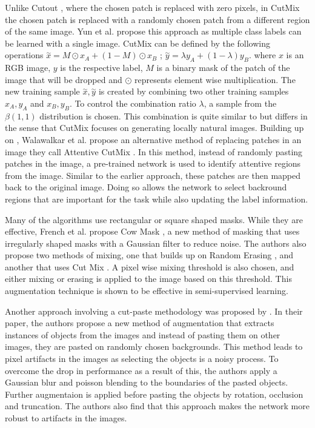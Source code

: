 Unlike Cutout \cite{devriesImprovedRegularizationConvolutional2017}, where the chosen patch is replaced with zero pixels, in CutMix \cite{yunCutMixRegularizationStrategy2019} the chosen patch is replaced with a randomly chosen patch from a different region of the same image. Yun et al. propose this approach as multiple class labels can be learned with a single image.
CutMix can be defined by the following operations $\overset{\sim}x = M \odot x_{A} + (1-M) \odot x_{B}$ ; $\overset{\sim}y = \lambda y_{A}+ (1- \lambda)y_{B}$. where $x$ is an RGB image, $y$ is the respective label, $M$ is a binary mask of the patch of the image that will be dropped and $\odot$ represents element wise multiplication. The new training sample $\overset{\sim}x , \overset{\sim}y$ is created by combining two other training samples $x_{A}, y_{A}$ and $x_{B} , y_{B}$. To control the combination ratio $\lambda$, a sample from the $\beta(1,1)$ distribution is chosen. This combination is quite similar to \cite{zhangMixupEmpiricalRisk2018} but differs in the sense that CutMix focuses on generating locally natural images.
Building up on \cite{yunCutMixRegularizationStrategy2019}, Walawalkar et al. propose an alternative method of replacing patches in an image they call Attentive CutMix \cite{walawalkarAttentiveCutMixEnhanced2020}. In this method, instead of randomly pasting patches in the image, a pre-trained network is used to identify attentive regions from the image. Similar to the earlier approach, these patches are then mapped back to the original image. Doing so allows the network to select backround regions that are important for the task while also updating the label information.

Many of the algorithms use rectangular or square shaped masks. While they are effective, French et al. propose Cow Mask \cite{frenchMilkingCowMaskSemiSupervised2020}, a new method of masking that uses irregularly shaped masks with a Gaussian filter to reduce noise. The authors also propose two methods of mixing, one that builds up on Random Erasing \cite{zhongRandomErasingData2020}, and another that uses Cut Mix \cite{yunCutMixRegularizationStrategy2019}. A pixel wise mixing threshold is also chosen, and either mixing or erasing is applied to the image based on this threshold. This augmentation technique is shown to be effective in semi-supervised learning.

Another approach involving a cut-paste methodology was proposed by \cite{dwibediCutPasteLearn2017}. In their paper, the authors propose a new method of augmentation that extracts instances of objects from the images and instead of pasting them on other images, they are pasted on randomly chosen backgrounds. This method leads to pixel artifacts in the images as selecting the objects is a noisy process. To overcome the drop in performance as a result of this, the authors apply a Gaussian blur and poisson blending to the boundaries of the pasted objects. Further augmentaion is applied before pasting the objects by rotation, occlusion and truncation. The authors also find that this approach makes the network more robust to artifacts in the images.

